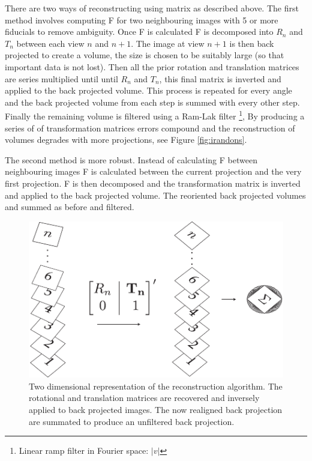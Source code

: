 There are two ways of reconstructing using matrix as described above.
The first method involves computing F for two neighbouring images with 5 or more fiducials to remove ambiguity.
Once F is calculated F is decomposed into $R_n$ and $T_n$ between each view $n$ and $n+1$.
The image at view $n+1$ is then back projected to create a volume, the size is chosen to be suitably large (so that important data is not lost).
Then all the prior rotation and translation matrices are series multiplied until until $R_n$ and $T_n$, this final matrix is inverted and applied to the back projected volume.
This process is repeated for every angle and the back projected volume from each step is summed with every other step.
Finally the remaining volume is filtered using a Ram-Lak filter \footnote{Linear ramp filter in Fourier space: $|v|$},
By producing a series of of transformation matrices errors compound and the reconstruction of volumes degrades with more projections, see Figure \ref{fig:irandons}.

The second method is more robust.
Instead of calculating F between neighbouring images F is calculated between the current projection and the very first projection.
F is then decomposed and the transformation matrix is inverted and applied to the back projected volume.
The reoriented back projected volumes and summed as before and filtered.

\begin{figure}
  \centering
  \includegraphics{Chapters/flopt/Figs/PDF/flopt_algorithm}
  \caption{Two dimensional representation of the reconstruction algorithm.
  The rotational and translation matrices are recovered and inversely applied to back projected images.
  The now realigned back projection are summated to produce an unfiltered back projection.}
\end{figure}

